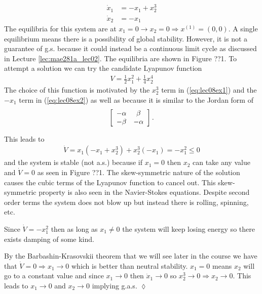 \begin{example}
\begin{align}
\label{eq:lec08ex1}
\dot{x}_1 &= -x_1+x_2^3 \\
\label{eq:lec08ex2}
\dot{x}_2 &= -x_1
\end{align}
The equilibria for this system are at $x_1=0\rightarrow x_2=0 \Rightarrow x^{(1)}=(0,0)$. A single equilibrium means there is a possibility of global stability. However, it is not a guarantee of g.s. because it could instead be a continuous limit cycle as discussed in Lecture \ref{lec:mae281a_lec02}. The equilibria are shown in Figure ??1. To attempt a solution we can try the candidate Lyapunov function
\begin{align*}
V=\tfrac{1}{2}x_1^2 + \tfrac{1}{4}x_2^4
\end{align*}
The choice of this function is motivated by the $x_2^3$ term in (\ref{eq:lec08ex1}) and the $-x_1$ term in (\ref{eq:lec08ex2}) as well as because it is similar to the Jordan form of
\begin{align*}
\left[\begin{array}{c c}
-\alpha & \beta \\ -\beta & -\alpha
\end{array}\right].
\end{align*}

This leads to
\begin{align*}
\dot{V} = x_1(-x_1+x_2^3)+ x_2^3(-x_1) = -x_1^2 \leq 0
\end{align*}
and the system is stable (not a.s.) because if $x_1=0$ then $x_2$ can take any value and $\dot{V}=0$ as seen in Figure ??1. The skew-symmetric nature of the solution causes the cubic terms of the Lyapunov function to cancel out. This skew-symmetric property is also seen in the Navier-Stokes equations. Despite second order terms the system does not blow up but instead there is rolling, spinning, etc.

Since $\dot{V}=-x_1^2$ then as long as $x_1\neq0$ the system will keep losing energy so there exists damping of some kind.

By the Barbashin-Krasovskii theorem that we will see later in the course we have that $\dot{V}=0\Rightarrow x_1\to0$ which is better than neutral stability. $x_1=0$ means $x_2$ will go to a constant value and since $x_1\to0$ then $\dot{x}_1\to0$ so $x_2^3\to0\Rightarrow x_2\to0$. This leads to $x_1\to0$ and $x_2\to0$ implying g.a.s.
$\lozenge$
\end{example}

